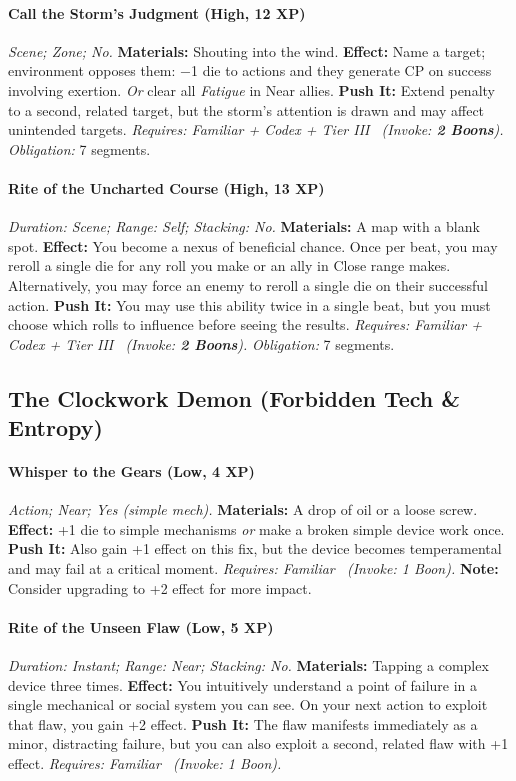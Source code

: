 \documentclass[12pt,twoside]{book}
\begin{document}
\paragraph{Call the Storm's Judgment (High, 12 XP)} \emph{Scene; Zone; No.}
\textbf{Materials:} Shouting into the wind.
\textbf{Effect:} Name a target; environment opposes them: −1 die to actions and they generate CP on success involving exertion. \emph{Or} clear all \emph{Fatigue} in Near allies.
\textbf{Push It:} Extend penalty to a second, related target, but the storm's attention is drawn and may affect unintended targets.
\emph{Requires: Familiar + Codex + Tier III \ (\textit{Invoke:} \textbf{2 Boons}).}
\emph{Obligation:} 7 segments.

\paragraph{Rite of the Uncharted Course (High, 13 XP)} \emph{Duration: Scene; Range: Self; Stacking: No.}
\textbf{Materials:} A map with a blank spot.
\textbf{Effect:} You become a nexus of beneficial chance. Once per beat, you may reroll a single die for any roll you make or an ally in Close range makes. Alternatively, you may force an enemy to reroll a single die on their successful action.
\textbf{Push It:} You may use this ability twice in a single beat, but you must choose which rolls to influence before seeing the results.
\emph{Requires: Familiar + Codex + Tier III \ (\textit{Invoke:} \textbf{2 Boons}).}
\emph{Obligation:} 7 segments.

\subsection{The Clockwork Demon (Forbidden Tech \& Entropy)}
\paragraph{Whisper to the Gears (Low, 4 XP)} \emph{Action; Near; Yes (simple mech).}
\textbf{Materials:} A drop of oil or a loose screw.
\textbf{Effect:} +1 die to simple mechanisms \emph{or} make a broken simple device work once.
\textbf{Push It:} Also gain +1 effect on this fix, but the device becomes temperamental and may fail at a critical moment.
\emph{Requires: Familiar \ (\textit{Invoke:} 1 Boon).} \textbf{Note:} Consider upgrading to +2 effect for more impact.
\paragraph{Rite of the Unseen Flaw (Low, 5 XP)} \emph{Duration: Instant; Range: Near; Stacking: No.}
\textbf{Materials:} Tapping a complex device three times.
\textbf{Effect:} You intuitively understand a point of failure in a single mechanical or social system you can see. On your next action to exploit that flaw, you gain +2 effect.
\textbf{Push It:} The flaw manifests immediately as a minor, distracting failure, but you can also exploit a second, related flaw with +1 effect.
\emph{Requires: Familiar \ (\textit{Invoke:} 1 Boon).}
\end{document}
